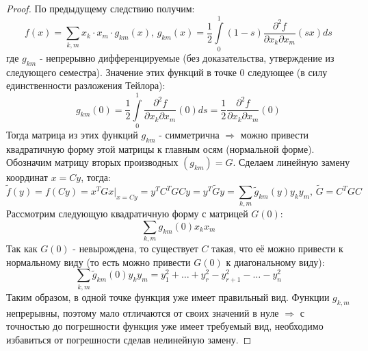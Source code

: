 \documentclass[12pt]{article}
\theoremstyle{definition}
\newcommand{\ddint}[2]{\displaystyle\int\limits_{#1}^{#2}}
\begin{document}
\begin{proof}
	По предыдущему следствию получим:
	$$
		f(x) = \sum\limits_{k,m}x_k{\cdot}x_m{\cdot}g_{km}(x), \, g_{km}(x) = \dfrac{1}{2} \ddint{0}{1}(1-s)\dfrac{\partial^2 f}{\partial x_k \partial x_m}(sx) ds
	$$
	где $g_{km}$ - непрерывно дифференцируемые (без доказательства, утверждение из следующего семестра). Значение этих функций в точке $0$ следующее (в силу единственности разложения Тейлора):
	$$
		g_{km}(0) = \dfrac{1}{2}\ddint{0}{1}\dfrac{\partial^2 f}{\partial x_k \partial x_m}(0) ds = \dfrac{1}{2}\dfrac{\partial^2 f}{\partial x_k \partial x_m}(0)
	$$
	Тогда матрица из этих функций $g_{km}$ - симметрична $\Rightarrow$ можно привести квадратичную форму этой матрицы к главным осям (нормальной форме). Обозначим матрицу вторых производных $(g_{km}) =G$. Сделаем линейную замену координат $x = Cy$, тогда:
	$$
		\widetilde{f}(y) = f(Cy) = x^T G x\big|_{x = Cy} = y^T C^T G C y = y^T \widetilde{G} y = \sum\limits_{k,m}\widetilde{g}_{km}(y)y_ky_m, \,  \widetilde{G}  = C^T G C
	$$
	Рассмотрим следующую квадратичную форму с матрицей $G(0)$:
	$$
		\sum\limits_{k,m}g_{km}(0)x_k x_m 
	$$
	Так как $G(0)$ - невырождена, то существует $C$ такая, что её можно привести к нормальному виду (то есть можно привести $G(0)$ к диагональному виду):
	$$
		\sum\limits_{k,m}\widetilde{g}_{km}(0)y_ky_m = y_1^2 + \dotsc + y_r^2 - y_{r+1}^2 - \dotsc - y_n^2	
	$$
	Таким образом, в одной точке функция уже имеет правильный вид. Функции $g_{k,m}$ непрерывны, поэтому мало отличаются от своих значений в нуле $\Rightarrow$ с точностью до погрешности функция уже имеет требуемый вид, необходимо избавиться от погрешности сделав нелинейную замену.
	

\end{proof}
\end{document}
